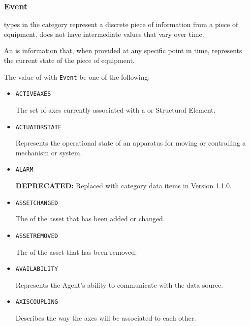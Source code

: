 \subsubsection{Event}
\label{sec:Event}



 types in the  category represent a discrete piece of information from a piece of equipment.   does not have intermediate values that vary over time.

An  is information that, when provided at any specific point in time, represents the current state of the piece of equipment.


The value of  with  \texttt{Event} \MUST be one of the following:
\begin{itemize}


\item \texttt{ACTIVE\textunderscore AXES}  

The set of axes currently associated with a  or  \gls{Structural Element}.


\item \texttt{ACTUATOR\textunderscore STATE}  

Represents the operational state of an apparatus for moving or controlling a mechanism or system.


\item \texttt{ALARM}  

\textbf{DEPRECATED:} Replaced with  category data items in Version 1.1.0.


\item \texttt{ASSET\textunderscore CHANGED}  

The  of the asset that has been added or changed.


\item \texttt{ASSET\textunderscore REMOVED}  

The  of the asset that has been removed.


\item \texttt{AVAILABILITY}  

Represents the \gls{Agent}'s ability to communicate with the data source.


\item \texttt{AXIS\textunderscore COUPLING}  

Describes the way the axes will be associated to each other. 
  

\end{itemize}
